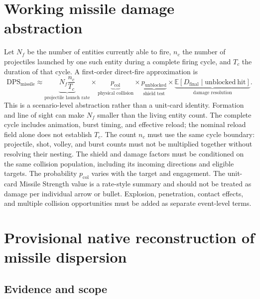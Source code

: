 \documentclass[11pt]{article}
\begin{document}
\section{Working missile damage abstraction}

Let $N_f$ be the number of entities currently able to fire, $n_c$ the number
of projectiles launched by one such entity during a complete firing cycle,
and $T_c$ the duration of that cycle.  A first-order direct-fire approximation is
\begin{equation}
  \mathrm{DPS}_{\mathrm{missile}}
  \approx
  \underbrace{N_f\frac{n_c}{T_c}}_{\text{projectile launch rate}}
  \times
  \underbrace{p_{\mathrm{col}}}_{\text{physical collision}}
  \times
  \underbrace{p_{\mathrm{unblocked}}}_{\text{shield test}}
  \times
  \underbrace{\mathbb{E}[D_{\mathrm{final}}\mid
                         \mathrm{unblocked\ hit}]}_{\text{damage resolution}}.
  \label{eq:missile-dps}
\end{equation}
This is a scenario-level abstraction rather than a unit-card identity.
Formation and line of sight can make $N_f$ smaller than the living entity
count.  The complete cycle includes animation, burst timing, and effective
reload; the nominal reload field alone does not establish $T_c$.  The count
$n_c$ must use the same cycle boundary: projectile, shot, volley, and burst
counts must not be multiplied together without resolving their nesting.
The shield and damage factors must be conditioned on the same collision
population, including its incoming directions and eligible targets.
The probability $p_{\mathrm{col}}$ varies with the target and engagement.  The
unit-card Missile Strength value is a rate-style summary and should not be
treated as damage per individual arrow or bullet.  Explosion, penetration,
contact effects, and multiple collision opportunities must be added as
separate event-level terms.

\section{Provisional native reconstruction of missile dispersion}
\label{sec:native-dispersion}

\subsection{Evidence and scope}
\end{document}
